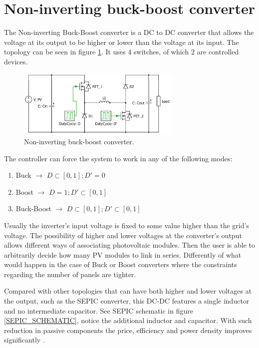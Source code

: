 
\section{Non-inverting buck-boost converter\label{N_INV_BB}}
		
The Non-inverting Buck-Boost converter is a DC to DC converter that allows the voltage at its output to be higher or lower than the voltage at its input. The topology can be seen in figure \ref{N_INV_BB_SCHEMATIC}. It uses 4 switches, of which 2 are controlled devices. 
		

\begin{figure}[htbp]
	\begin{center}
	\includegraphics[width=0.7\textwidth]{../Pictures/2_d_H_B_BB}
	\caption{Non-inverting buck-boost converter.}
	\label{N_INV_BB_SCHEMATIC}
	\end{center}	
\end{figure}

		
The controller can force the system to work in any of the following modes:

\begin{enumerate}
	\item Buck $\rightarrow$ $ D \subset [0,1];	 D' = 0 $
	\item Boost $\rightarrow$ $ D = 1;	 D' \subset [0,1] $
	\item Buck-Boost $\rightarrow$ $ D \subset [0,1]; D' \subset [0,1] $
\end{enumerate}
		
Usually the inverter's input voltage is fixed to some value higher than the grid's voltage. The possibility of higher and lower voltages at the converter's output allows different ways of associating photovoltaic modules. Then the user is able to arbitrarily decide how many PV modules to link in series. Differently of what would happen in the case of Buck or Boost converters where the constraints regarding the number of panels are tighter.
		
Compared with other topologies that can have both higher and lower voltages at the output, such as the SEPIC converter, this DC-DC features a single inductor and no intermediate capacitor. See SEPIC schematic in figure \ref{SEPIC_SCHEMATIC}, notice the additional inductor and capacitor. With such reduction in passive components the price, efficiency and power density improves significantly \cite{underthehood}.

